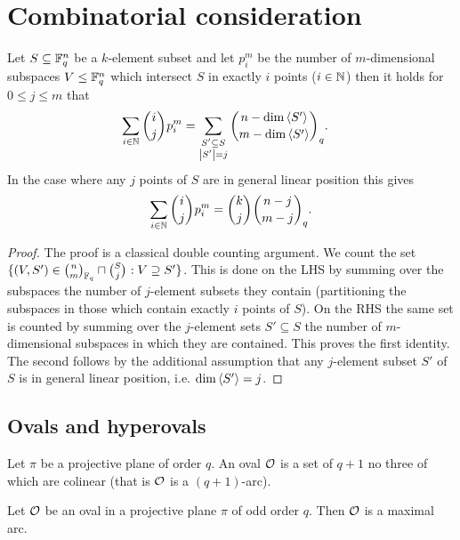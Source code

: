 \documentclass[a4paper]{article}
\begin{document}
\section{Combinatorial consideration}
\begin{lemma}
  Let $S\subseteq \mathbb{F}_{q}^n$ be a $k$-element subset and let $p_i^m$ be the
  number of $m$-dimensional subspaces $V\leq \mathbb{F}_{q}^n$ which
  intersect $S$ in exactly $i$ points
  ($i\in\mathbb{N}$) then it holds for $0\leq j\leq m$ that
  \begin{align}
    \sum_{i\in\nats}{\binom{i}{j}p^m_i} &= \sum_{\substack{S'\subseteq S\\
        \card{S'}=j}}{\binom{n-\dim\gen{S'}}{m-\dim\gen{S'}}_q}\text{.}
  \end{align}
  In the case where any $j$ points of $S$ are in general linear position this
  gives
  \begin{align}
    \sum_{i\in\nats}{\binom{i}{j}p^m_i}=\binom{k}{j}\binom[q]{n-j}{m-j}\text{.}
  \end{align} 
\end{lemma}

\begin{proof}
  The proof is a classical double counting argument. We count the set
  $\{(V,S')\in\binom[\field{q}]{n}{m}\times\binom{S}{j}:V\supseteq
  S'\}$. This is done on the LHS by summing over the subspaces the
  number of $j$-element subsets they contain (partitioning the subspaces
  in those which contain exactly $i$ points of $S$). On the RHS the same
  set is counted by summing over the $j$-element sets $S'\subseteq S$
  the number of $m$-dimensional subspaces in which they are contained.
  This proves the first identity.
  The second follows by the additional assumption that any $j$-element
  subset $S'$ of $S$ is in general linear position, i.e. $\dim\gen{S'}=j$.
\end{proof}


\subsection{Ovals and hyperovals}

\begin{definition}[oval]
    Let $\pi$ be a projective plane of order $q$. An oval $\mathcal{O}$ is a set of $q+1$ no three of which are colinear (that is $\mathcal{O}$ is a $(q+1)$-arc).  
\end{definition}

\begin{lemma} 
    Let $\mathcal{O}$ be an oval in a projective plane $\pi$ of odd order $q$.
    Then $\mathcal{O}$ is a maximal arc.
\end{lemma}
\end{document}
